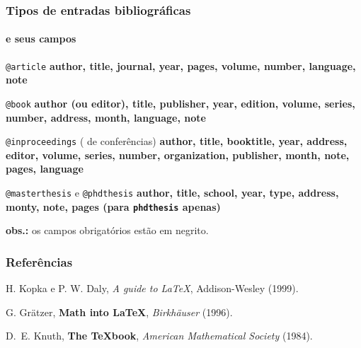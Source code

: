 \documentclass[handout,10pt]{beamer}
\begin{document}
\fi
\appendix
\begin{frame}[label=tiposXcampos]
	\frametitle{Tipos de entradas bibliográficas}
	\framesubtitle{e seus campos}
	
	\footnotesize
	
	\begin{block}{\texttt{@article}}
	\bfseries author, title, journal, year, pages, \mdseries volume, number,
	language, note
	\end{block}\vfill
	
	\begin{block}{\texttt{@book}}
	\bfseries author (ou editor), title, publisher, year, \mdseries edition,
	volume, series, number, address, month, language, note
	\end{block}\vfill
	
	\begin{block}{\texttt{@inproceedings} ( de
	conferências)}
	\bfseries author, title, booktitle, year, \mdseries address, editor, volume, 
	series, number, organization, publisher, month, note, pages, language
	\end{block}\vfill
	
	\begin{block}{\texttt{@masterthesis} e \texttt{@phdthesis}}
	\bfseries author, title, school, year, \mdseries type, address, monty, note,
	pages (para \texttt{phdthesis} apenas)
	\end{block}\vfill
	
	\tiny
	\textbf{obs.:} os campos obrigatórios estão em negrito.
	
\end{frame}
\begin{frame}
	\frametitle{Referências}

	\begin{thebibliography}{-}
	
	    H. Kopka e P. W. Daly,      %
	    \textsl{A guide to \LaTeX}, %
	    Addison-Wesley              %
	    (1999).                     %
	    
	   	G. Grätzer,                 %
	   	\textbf{Math into \LaTeX},  %
	   	\textit{Birkhäuser}         %
	   	(1996).                     %
	   				
   		D.~E. Knuth,                           %
   		\textbf{The {\TeX}book},               %
   		\textit{American Mathematical Society} %
   		(1984).                                %
	\end{thebibliography}
\end{frame}
\end{document}
